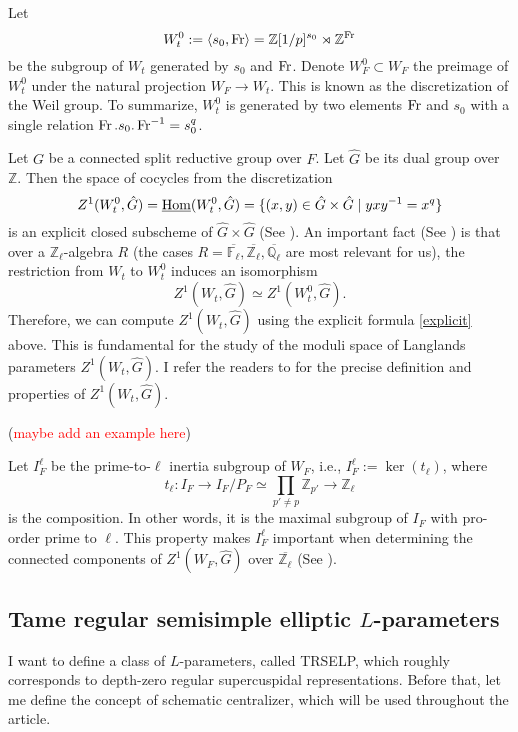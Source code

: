 	Let 
	$$W_t^0:=\left<s_0, \operatorname{Fr}\right>=\mathbb{Z}[1/p]^{s_0} \rtimes \mathbb{Z}^{\operatorname{Fr}}$$ 
	be the subgroup of $W_t$ generated by $s_0$ and $\operatorname{Fr}$. Denote $W_F^0 \subset W_F$ the preimage of $W_t^0$ under the natural projection $W_F \to W_t$. This is known as the discretization of the Weil group. To summarize, $W_t^0$ is generated by two elements $\operatorname{Fr}$ and $s_0$ with a single relation $\operatorname{Fr}.s_0.\operatorname{Fr}^{-1}=s_0^q$. 
	
	Let $G$ be a connected split reductive group over $F$. Let $\hat{G}$ be its dual group over $\mathbb{Z}$. Then the space of cocycles from the discretization
	\begin{equation}\label{explicit}
		Z^1(W_t^0, \hat{G})=\underline{\operatorname{\operatorname{Hom}}}(W_t^0, \hat{G})=\{(x, y) \in \hat{G} \times \hat{G}\;|\;yxy^{-1}=x^q\}
	\end{equation}
	is an explicit closed subscheme of $\hat{G} \times \hat{G}$ (See \cite[Section 3]{dat2022ihes}). An important fact (See \cite[Proposition 3.9]{dat2022ihes}) is that over a $\mathbb{Z}_{\ell}$-algebra $R$ (the cases $R=\overline{\mathbb{F}_{\ell}}, \overline{\mathbb{Z}_{\ell}}, \overline{\mathbb{Q}_{\ell}}$ are most relevant for us), the restriction from $W_t$ to $W_t^0$ induces an isomorphism
	$$Z^1(W_t, \hat{G}) \simeq Z^1(W_t^0, \hat{G}).$$ 
	Therefore, we can compute $Z^1(W_t, \hat{G})$ using the explicit formula \eqref{explicit} above. This is fundamental for the study of the moduli space of Langlands parameters $Z^1(W_t, \hat{G})$. I refer the readers to \cite[Section 3 and Section 4]{dat2022ihes} for the precise definition and properties of $Z^1(W_t, \hat{G})$. 
	
	(\textcolor{red}{maybe add an example here})
	
	Let $I_F^{\ell}$ be the prime-to-$\ell$ inertia subgroup of $W_F$, i.e., $I_F^{\ell}:=\ker(t_{\ell})$, where 
	$$t_\ell: I_F \to I_F/P_F \simeq \prod_{p' \neq p}\mathbb{Z}_{p'} \to \mathbb{Z}_\ell$$
	is the composition. In other words, it is the maximal subgroup of $I_F$ with pro-order prime to $\ell$. This property makes $I_F^{\ell}$ important when determining the connected components of $Z^1(W_F, \hat{G})$ over $\overline{\mathbb{Z}_{\ell}}$ (See \cite[Theorem 4.2 and Subsection 4.6]{dat2022ihes}). 
	
	\subsection{Tame regular semisimple elliptic $L$-parameters}
	
	I want to define a class of $L$-parameters, called TRSELP, which roughly corresponds to depth-zero regular supercuspidal representations. Before that, let me define the concept of schematic centralizer, which will be used throughout the article.
	
